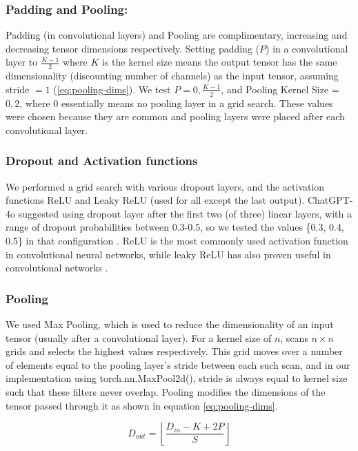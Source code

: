 \subsubsection{Padding and Pooling:}
Padding (in convolutional layers) and Pooling are complimentary, increasing and decreasing tensor dimensions respectively. Setting padding ($P$) in a convolutional layer to $\frac {K-1}2$ where $K$ is the kernel size means the output tensor has the same dimensionality (discounting number of channels) as the input tensor, assuming stride $= 1$ (\ref{eq:pooling-dims}). We test $P = 0,\frac {K-1}2$, and Pooling Kernel Size = $0,2$, where $0$ essentially means no pooling layer in a grid search. These values were chosen because they are common and pooling layers were placed after each convolutional layer.

\subsubsection{Dropout and Activation functions}
We performed a grid search with various dropout layers, and the activation functions ReLU and Leaky ReLU (used for all except the last output). ChatGPT-4o suggested using dropout layer after the first two (of three) linear layers, with a range of dropout probabilities between 0.3-0.5, so we  tested the values \{0.3, 0.4, 0.5\} in that configuration \cite{openai2023chatgpt}.  ReLU is the most commonly used activation function in convolutional neural networks, while leaky ReLU has also proven useful in convolutional networks \cite {activation_functions}.
\subsubsection{Pooling}
We used Max Pooling, which is used to reduce the dimensionality of an input tensor (usually after a convolutional layer). For a kernel size of $n$, scans $n\times n$ grids and selects the highest values respectively. This grid moves over a number of elements equal to the pooling layer's stride between each such scan, and in our implementation using torch.nn.MaxPool2d(), stride is always equal to kernel size such that these filters never overlap. Pooling modifies the dimensions of the tensor passed through it as shown in equation \ref{eq:pooling-dims}.

\begin{equation}
    D_{out} = \left\lfloor\frac {D_{in} -K + 2P}{S}\right\rfloor
    \label{eq:pooling-dims}
\end{equation}


